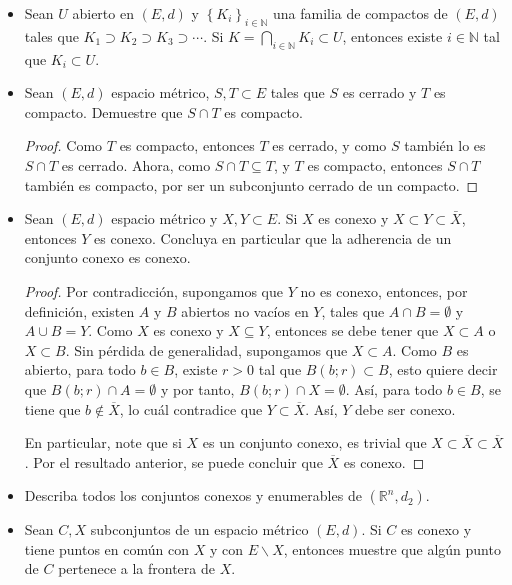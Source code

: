 \begin{itemize}[leftmargin=*]
    \item Sean $U$ abierto en $(E, d)$ y $\left\{K_i\right\}_{i \in \mathbb{N}}$ una familia de compactos de $(E, d)$ tales que $K_1 \supset K_2 \supset K_3 \supset \cdots$. Si $K=\bigcap_{i \in \mathbb{N}} K_i \subset U$, entonces existe $i \in \mathbb{N}$ tal que $K_i \subset U$.
    
    \item Sean $(E, d)$ espacio métrico, $S, T \subset E$ tales que $S$ es cerrado y $T$ es compacto. Demuestre que $S \cap T$ es compacto.
    \begin{proof}
        Como $T$ es compacto, entonces $T$ es cerrado, y como $S$ también lo es $S\cap T$ es cerrado. Ahora, como $S\cap T \subseteq T$, y $T$ es compacto, entonces $S \cap T$ también es compacto, por ser un subconjunto cerrado de un compacto. 
    \end{proof}
    
    \item Sean $(E, d)$ espacio métrico y $X, Y \subset E$. Si $X$ es conexo y $X \subset Y \subset \bar{X}$, entonces $Y$ es conexo. Concluya en particular que la adherencia de un conjunto conexo es conexo.
    \begin{proof}
        Por contradicción, supongamos que $Y$ no es conexo, entonces, por definición, existen $A$ y $B$ abiertos no vacíos en $Y$, tales que $A\cap B=\emptyset$ y $A \cup B=Y$. Como $X$ es conexo y $X \subseteq Y$, entonces se debe tener que $X \subset A$ o $X \subset B$. Sin pérdida de generalidad, supongamos que $X \subset A$. Como $B$ es abierto, para todo $b \in B$, existe $r>0$ tal que $B(b;r) \subset B$, esto quiere decir que $B(b;r)\cap A=\emptyset$ y por tanto, $B(b;r)\cap X=\emptyset$. Así, para todo $b \in B$, se tiene que $b \notin \overline{X}$, lo cuál contradice que $Y \subset \overline{X}$. Así, $Y$ debe ser conexo. 

        En particular, note que si $X$ es un conjunto conexo, es trivial que $X \subset \overline{X} \subset \overline{X}$. Por el resultado anterior, se puede concluir que $\overline{X}$ es conexo.
    \end{proof}

    \item Describa todos los conjuntos conexos y enumerables de $\left(\mathbb{R}^n, d_2\right)$.
    
    \item Sean $C, X$ subconjuntos de un espacio métrico $(E, d)$. Si $C$ es conexo y tiene puntos en común con $X$ y con $E \backslash X$, entonces muestre que algún punto de $C$ pertenece a la frontera de $X$.
\end{itemize}




